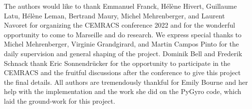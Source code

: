 \documentclass[proc]{edpsmath}
\begin{document}
\maketitle

\tableofcontents %








\appendix



\begin{acknowledgement}
	The authors would like to thank Emmanuel Franck, Hélène Hivert, Guillaume Latu, Hélène Leman, Bertrand Maury, Michel Mehrenberger, and Laurent Navoret for organizing the CEMRACS conference 2022 and for the wonderful opportunity to come to Marseille and do research. We express special thanks to Michel Mehrenberger, Virginie Grandgirard, and Martin Campos Pinto for the daily supervision and general shaping of the project. Dominik Bell and Frederik Schnack thank Eric Sonnendrücker for the opportunity to participate in the CEMRACS and the fruitful discussions after the conference to give this project the final details. All authors are tremendously thankful for Emily Bourne and her help with the implementation and the work she did on the PyGyro code, which laid the ground-work for this project.
\end{acknowledgement}



\end{document}

